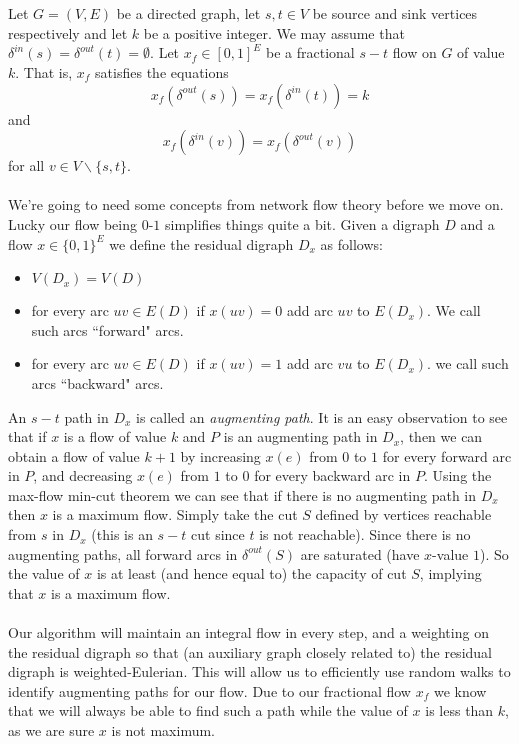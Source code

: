 \documentclass[letterpaper,12pt,oneside,onecolumn]{article}
\begin{document}
\section{}
\paragraph{}
Let $G=(V,E)$ be a directed graph, let $s,t\in V$ be source and sink vertices respectively and let $k$ be a positive integer. We may assume that $\delta^{in}(s) = \delta^{out}(t) = \emptyset$. Let $x_f \in [0,1]^E$ be a fractional $s-t$ flow on $G$ of value $k$. That is, $x_f$ satisfies the equations
$$ x_f(\delta^{out}(s)) = x_f(\delta^{in}(t)) = k$$
and
$$x_f(\delta^{in}(v)) = x_f(\delta^{out}(v))$$
for all $v \in V\backslash\{s,t\}$.
\paragraph{}
We're going to need some concepts from network flow theory before we move on. Lucky our flow being $0$-$1$ simplifies things quite a bit. Given a digraph $D$ and a flow $x \in \{0,1\}^E$ we define the residual digraph $D_x$ as follows: 
\begin{itemize}
\item$V(D_x) = V(D)$
\item for every arc $uv \in E(D)$ if $x(uv) = 0$ add arc $uv$ to $E(D_x)$. We call such arcs ``forward" arcs.
\item for every arc $uv \in E(D)$ if $x(uv) = 1$ add arc $vu$ to $E(D_x)$. we call such arcs ``backward" arcs.
\end{itemize} 
An $s-t$ path in $D_x$ is called an \emph{augmenting path}. It is an easy observation to see that if $x$ is a flow of value $k$ and $P$ is an augmenting path in $D_x$, then we can obtain a flow of value $k+1$ by increasing $x(e)$ from $0$ to $1$ for every forward arc in $P$, and decreasing $x(e)$ from $1$ to $0$ for every backward arc in $P$. Using the max-flow min-cut theorem we can see that if there is no augmenting path in $D_x$ then $x$ is a maximum flow. Simply take the cut $S$ defined by vertices reachable from $s$ in $D_x$ (this is an $s-t$ cut since $t$ is not reachable). Since there is no augmenting paths, all forward arcs in $\delta^{out}(S)$ are saturated (have $x$-value $1$). So the value of $x$ is at least (and hence equal to) the capacity of cut $S$, implying that $x$ is a maximum flow.
\paragraph{}
Our algorithm will maintain an integral flow in every step, and a weighting on the residual digraph so that (an auxiliary graph closely related to) the residual digraph is weighted-Eulerian. This will allow us to efficiently use random walks to identify augmenting paths for our flow. Due to our fractional flow $x_f$ we know that we will always be able to find such a path while the value of $x$ is less than $k$, as we are sure $x$ is not maximum.
\end{document}
